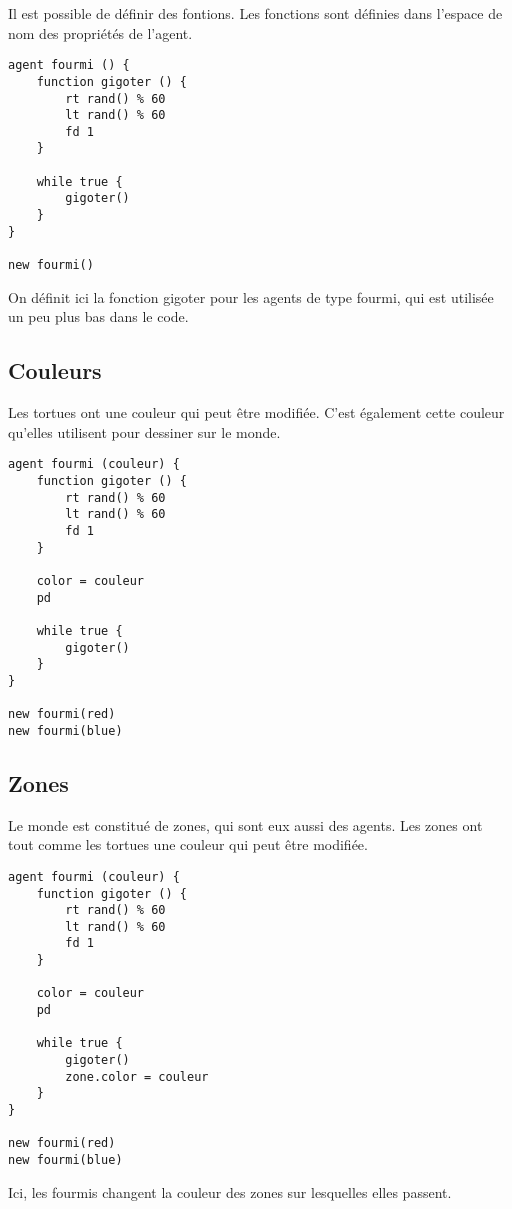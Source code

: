 Il est possible de définir des fontions. Les fonctions sont définies dans l'espace de nom des propriétés de l'agent.

\begin{verbatim}
agent fourmi () {
    function gigoter () {
        rt rand() % 60
        lt rand() % 60
        fd 1
    }

    while true {
        gigoter()
    }
}

new fourmi()
\end{verbatim}

On définit ici la fonction gigoter pour les agents de type fourmi, qui est utilisée un peu plus bas dans le code.

\subsection{Couleurs}

Les tortues ont une couleur qui peut être modifiée. C'est également cette couleur qu'elles utilisent pour dessiner sur le monde.

\begin{verbatim}
agent fourmi (couleur) {
    function gigoter () {
        rt rand() % 60
        lt rand() % 60
        fd 1
    }

    color = couleur
    pd

    while true {
        gigoter()
    }
}

new fourmi(red)
new fourmi(blue)
\end{verbatim}

\subsection{Zones}

Le monde est constitué de zones, qui sont eux aussi des agents. Les zones ont tout comme les tortues une couleur qui peut être modifiée.

\begin{verbatim}
agent fourmi (couleur) {
    function gigoter () {
        rt rand() % 60
        lt rand() % 60
        fd 1
    }

    color = couleur
    pd

    while true {
        gigoter()
        zone.color = couleur
    }
}

new fourmi(red)
new fourmi(blue)
\end{verbatim}

Ici, les fourmis changent la couleur des zones sur lesquelles elles passent.

